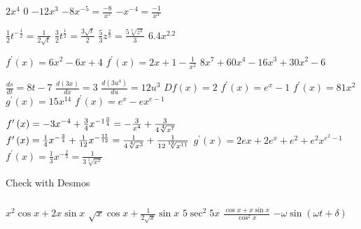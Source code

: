 \begin{Answer}[ref={exStandardDerivatives}]
	\Question %
\begin{tasks}
	\task $2 x^{4}$
	\task $0$
	\task $ -12 x^{3}$
	\task $ -8 x^{ -5} =\frac{ -8}{x^{5}}$
	\task $ -x^{ -4} =\frac{ -1}{x^{4}}$
\end{tasks}

\Question %
\begin{tasks}
	\task $\frac{1}{2} t^{ -\frac{1}{2}} =\frac{1}{2 \sqrt{t}}$
	\task $\frac{3}{2} t^{\frac{1}{2}} =\frac{3 \sqrt{t}}{2}$
	\task $\frac{5}{3} z^{\frac{2}{3}} =\frac{5 \sqrt[{3}]{z^{2}}}{3}$
	\task $6.4 x^{2.2}$ 
\end{tasks}

\Question %
\begin{tasks}
	\task $f^{ \prime } \left (x\right ) =6 x^{2} -6 x +4$
	\task $f^{ \prime } \left (x\right ) =2 x +1 -\frac{1}{x^{2}}$ 
	\task $8 x^{7} +60 x^{4} -16 x^{3} +30 x^{2} -6$
\end{tasks}

\Question 
\begin{tasks}
	\task $\frac{d s}{d t} =8 t -7$ 
	\task $\frac{d \left (3 x\right )}{d x} =3$ 
	\task $\frac{d \left (3 u^{4}\right )}{d u} =12 u^{3}$ 
	\task $D f \left (x\right ) =2$ 
	\task $f^{ \prime } \left (x\right ) =e^{x} -1$
	\task $f^{ \prime } \left (x\right ) =81 x^{2}$
	\task $g^{ \prime } \left (x\right ) =15 x^{14}$
	\task $f^{ \prime } \left (x\right ) =e^{x} -e x^{e -1}$ 
\end{tasks}

\Question %
\begin{tasks}
	\task $f^{ \prime } \left (x\right ) = -3 x^{ -4} +\frac{3}{4} x^{ -1\frac{3}{4}}\\
	 = -\frac{3}{x^{4}} +\frac{3}{4 \sqrt[{4}]{x^{7}}}$
	\task $f^{ \prime } \left (x\right ) =\frac{1}{4} x^{ -\frac{3}{4}} +\frac{1}{12} x^{ -\frac{11}{12}}\\ =\frac{1}{4 \sqrt[{4}]{x^{3}}} +\frac{1}{12 \sqrt[{12}]{x^{11}}}$ 
	\task $g^{ \prime } \left (x\right ) =2 e x +2 e^{x} +e^{2} +e^{2} x^{e^{2} -1}$
	\task $f^{ \prime } \left (x\right ) =\frac{1}{3} x^{ -\frac{2}{3}} =\frac{1}{3 \sqrt[{3}]{x^{2}}}$
\end{tasks}

\Question %
Check with Desmos\\
$\phantom{1}$\\
\Question %
\begin{tasks}
	\task $x^{2} \cos  x +2 x \sin  x$
	\task $\sqrt{x} \cos  x +\frac{1}{2 \sqrt{x}} \sin  x$
	\task $5 \sec ^{2} 5 x$
	\task $\frac{\cos  x +x \sin  x}{\cos ^{2} x}$ 
	\task $ -\omega  \sin  \left (\omega  t +\delta \right )$ 
\end{tasks}


\end{Answer}
